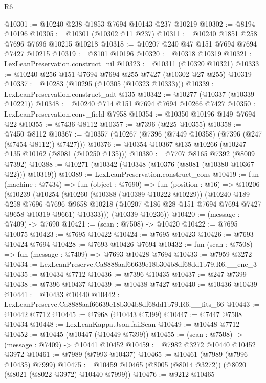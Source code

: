 \begin{lexlean}{R6}
\begin{coremodule}
@10301 := @10240 @238 @1853 @7694 @10143 @237 @10219
@10302 := @8194 @10196
@10305 := @10301 (@10302 @11 @237)
@10311 := @10240 @1851 @258 @7696 @7696 @10215 @10218
@10318 := @10207 @240 @47 @151 @7694 @7694 @7427 @10215
@10319 := @8101 @10196
@10320 := @10318 @10319
@10321 := LexLeanPreservation.construct_nil
@10323 := @10311 (@10320 @10321)
@10333 := @10240 @256 @151 @7694 @7694 @255 @7427 (@10302 @27 @255) @10319
@10337 := @10283 (@10295 (@10305 (@10323 @10333)))
@10339 := LexLeanPreservation.construct_adt @135
@10342 := @10277 (@10337 (@10339 @10221))
@10348 := @10240 @714 @151 @7694 @7694 @10266 @7427
@10350 := LexLeanPreservation.conv_field @7958
@10354 := @10350 @10196 @149 @7694 @22
@10355 := @7436 @8112
@10357 := @7396 (@225 @10355)
@10358 := @7450 @8112
@10367 := @10357 (@10267 (@7396 (@7449 @10358) (@7396 (@247 (@7454 @8112)) @7427)))
@10376 := @10354 @10367 @135 @10266 (@10247 @135 @10162 (@8081 (@10250 @135)))
@10380 := @7707 @8165 @7392 (@8009 @7392)
@10388 := @10271 (@10342 (@10348 (@10376 (@8081 (@10380 @10367 @22))) @10319))
@10389 := LexLeanPreservation.construct_cons
@10419 := fun (machine : @7434) =>
  fun (object : @7690) =>
  fun (position : @16) =>
  @10206
    (@10239
      (@10254
        (@10260
          (@10388 (@10389 @10222 @10229))
          (@10240
            @189
            @258
            @7696
            @7696
            @9658
            @10218
            (@10207 @186 @28 @151 @7694 @7694 @7427 @9658 @10319 @9661)
            @10333)))
      (@10339 @10236))
@10420 := (message : @7409) -> @7690
@10421 := (scan : @7508) -> @10420
@10422 := @7695 @10075
@10423 := @7695 @10422
@10424 := @7695 @10423
@10426 := @7693 @10424 @7694
@10428 := @7693 @10426 @7694
@10432 := fun (scan : @7508) => fun (message : @7409) => @7693 @10428 @7694
@10433 := @7959 @3272
@10434 := LexLeanPreserve.Ca8888aaf66639e18b304b8df68dd1b79.R6.__enc_3
@10435 := @10434 @7712
@10436 := @7396 @10435
@10437 := @247 @7399
@10438 := @7396 @10437
@10439 := @10438 @7427
@10440 := @10436 @10439
@10441 := @10433 @10440
@10442 := LexLeanPreserve.Ca8888aaf66639e18b304b8df68dd1b79.R6.__fits_66
@10443 := @10442 @7712
@10445 := @7968 (@10443 @7399)
@10447 := @7447 @7508 @10434
@10448 := LexLeanKappa.Json.failScan
@10449 := @10448 @7712
@10452 := @10445 (@10447 (@10449 @7399))
@10455 := (scan : @7508) -> (message : @7409) -> @10441 @10452
@10459 := @7982 @3272 @10440 @10452 @3972
@10461 := @7989 (@7993 @10437)
@10465 := @10461 (@7989 (@7996 @10435) @7999)
@10475 := @10459 @10465 (@8005 (@8014 @3272)) (@8020 (@8021 (@8022 @3972) @10440 @7999))
@10476 := @9212 @10465

\end{coremodule}
\end{lexlean}
